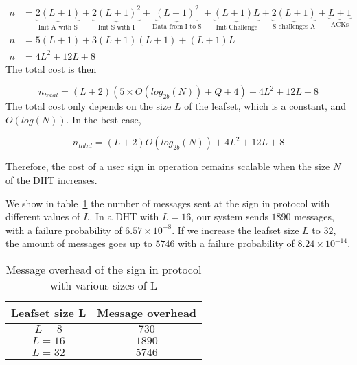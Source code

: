     \begin{align}
      n &= \underbrace{2(L+1)}_\text{Init A with S} +
           \underbrace{2(L+1)^2}_\text{Init S with I} +
           \underbrace{(L+1)^2}_\text{Data from I to S} +
           \underbrace{(L+1)L}_\text{Init Challenge} +
           \underbrace{2(L+1)}_\text{S challenges A} +
           \underbrace{L+1}_\text{ACKs}\\
      n &= 5(L+1) + 3(L+1)(L+1)+ (L+1)L\\
      n &= 4L^2 +12L + 8 
    \end{align}
     The total cost is then

    $$
      n_{total} = (L +2)(5 \times O(log_{2b}(N)) + Q + 4) + 4L^2 +12L + 8 
    $$    
    The total cost only depends on the size $L$ of the leafset, which is a
constant, and $O(log(N))$. In the best case, 

    $$
      n_{total} = (L +2)O(log_{2b}(N)) + 4L^2 +12L + 8 
    $$

    Therefore, the cost of a user sign in operation remains
scalable when the size $N$ of the DHT increases.

    We show in table~\ref{tab:sign_in_messages} the number of messages sent at
the sign in protocol with different values of $L$. In a DHT with
$L = 16$, our system sends $1890$ messages, with a failure probability of
 $6.57 \times 10^{-8}$. If we increase the leafset size $L$ to $32$, the amount of
messages goes up to $5746$ with a failure probability of $8.24 \times 10^{-14}$.



\begin{table}
  \centering
  \footnotesize
  \begin{tabular}{|c|c|}
    \hline
     \textbf{Leafset size L} & \textbf{Message overhead}\\
    \hline
      $L = 8$ & $730$\\
    \hline
      $L = 16$ & $1890$\\
    \hline
      $L = 32$ & $5746$\\
    \hline
  \end{tabular}
  \caption{Message overhead of the sign in protocol with various sizes of L}
  \label{tab:sign_in_messages}
\end{table}



